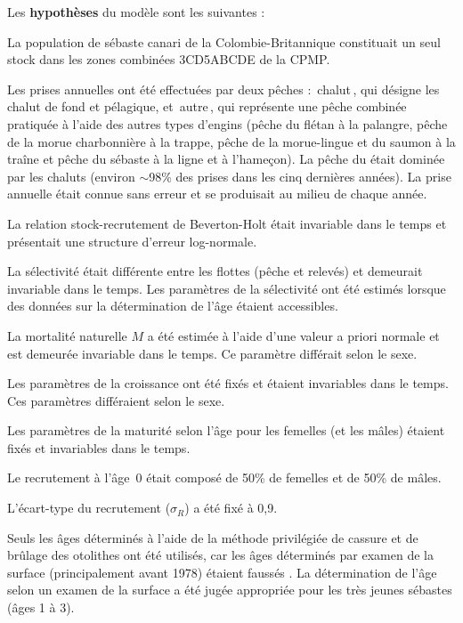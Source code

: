 \documentclass[11pt]{book}
\newcommand{\pc}{\%}
\newcommand{\angL}{\guillemotleft\,}
\newcommand{\angR}{\,\guillemotright}
\begin{document}
Les \textbf{hypoth\`{e}ses} du mod\`{e}le sont les suivantes :
\begin{enumerate_csas}{}{}
\item La population de s\'{e}baste canari de la Colombie-Britannique constituait un seul stock dans les zones combin\'{e}es 3CD5ABCDE de la CPMP.
\item Les prises annuelles ont \'{e}t\'{e} effectu\'{e}es par deux p\^{e}ches : \angL{}chalut\angR{}, qui d\'{e}signe les chalut de fond et p\'{e}lagique, et \angL{}autre\angR{}, qui repr\'{e}sente une p\^{e}che combin\'{e}e pratiqu\'{e}e \`{a} l'aide des autres types d'engins (p\^{e}che du fl\'{e}tan \`{a} la palangre, p\^{e}che de la morue charbonni\`{e}re \`{a} la trappe, p\^{e}che de la morue-lingue et du saumon \`{a} la tra\^{i}ne et p\^{e}che du s\'{e}baste \`{a} la ligne et \`{a} l'hame\c{c}on). La p\^{e}che du \spc{} \'{e}tait domin\'{e}e par les chaluts (environ $\sim$98\pc{} des prises dans les cinq derni\`{e}res ann\'{e}es). La prise annuelle \'{e}tait connue sans erreur et se produisait au milieu de chaque ann\'{e}e.
\item La relation stock-recrutement de Beverton-Holt \'{e}tait invariable dans le temps et pr\'{e}sentait une structure d'erreur log-normale.
\item La s\'{e}lectivit\'{e} \'{e}tait diff\'{e}rente entre les flottes (p\^{e}che et relev\'{e}s) et demeurait invariable dans le temps. Les param\`{e}tres de la s\'{e}lectivit\'{e} ont \'{e}t\'{e} estim\'{e}s lorsque des donn\'{e}es sur la d\'{e}termination de l'\^{a}ge \'{e}taient accessibles.
\item La mortalit\'{e} naturelle $M$ a \'{e}t\'{e} estim\'{e}e \`{a} l'aide d'une valeur a priori normale et est demeur\'{e}e invariable dans le temps. Ce param\`{e}tre diff\'{e}rait selon le sexe.
\item Les param\`{e}tres de la croissance ont \'{e}t\'{e} fix\'{e}s et \'{e}taient invariables dans le temps. Ces param\`{e}tres diff\'{e}raient selon le sexe.
\item Les param\`{e}tres de la maturit\'{e} selon l'\^{a}ge pour les femelles (et les m\^{a}les) \'{e}taient fix\'{e}s et invariables dans le temps.
\item Le recrutement \`{a} l'\^{a}ge~0 \'{e}tait compos\'{e} de 50\pc{} de femelles et de 50\pc{} de m\^{a}les.
\item L'\'{e}cart-type du recrutement ($\sigma_R$) a \'{e}t\'{e} fix\'{e} \`{a} 0,9.
\item Seuls les \^{a}ges d\'{e}termin\'{e}s \`{a} l'aide de la m\'{e}thode privil\'{e}gi\'{e}e de cassure et de br\^{u}lage des otolithes \citep{MacLellan:1997} ont \'{e}t\'{e} utilis\'{e}s, car les \^{a}ges d\'{e}termin\'{e}s par examen de la surface (principalement avant 1978) \'{e}taient fauss\'{e}s \citep{Beamish:1979}. La d\'{e}termination de l'\^{a}ge selon un examen de la surface a \'{e}t\'{e} jug\'{e}e appropri\'{e}e pour les tr\`{e}s jeunes s\'{e}bastes (\^{a}ges 1 \`{a} 3).

\end{enumerate_csas}
\end{document}
